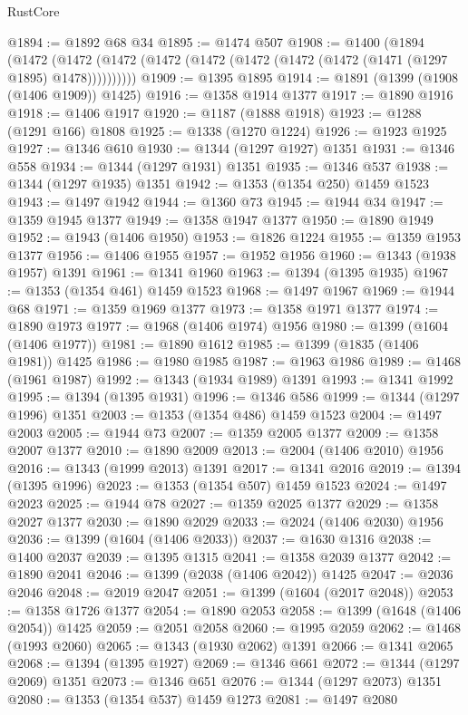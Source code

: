 \begin{lexlean}{RustCore}
\begin{coremodule}
@1894 := @1892 @68 @34
@1895 := @1474 @507
@1908 := @1400
    (@1894
      (@1472 (@1472 (@1472 (@1472 (@1472 (@1472 (@1472 (@1472 (@1471 (@1297 @1895) @1478))))))))))
@1909 := @1395 @1895
@1914 := @1891 (@1399 (@1908 (@1406 @1909)) @1425)
@1916 := @1358 @1914 @1377
@1917 := @1890 @1916
@1918 := @1406 @1917
@1920 := @1187 (@1888 @1918)
@1923 := @1288 (@1291 @166) @1808
@1925 := @1338 (@1270 @1224)
@1926 := @1923 @1925
@1927 := @1346 @610
@1930 := @1344 (@1297 @1927) @1351
@1931 := @1346 @558
@1934 := @1344 (@1297 @1931) @1351
@1935 := @1346 @537
@1938 := @1344 (@1297 @1935) @1351
@1942 := @1353 (@1354 @250) @1459 @1523
@1943 := @1497 @1942
@1944 := @1360 @73
@1945 := @1944 @34
@1947 := @1359 @1945 @1377
@1949 := @1358 @1947 @1377
@1950 := @1890 @1949
@1952 := @1943 (@1406 @1950)
@1953 := @1826 @1224
@1955 := @1359 @1953 @1377
@1956 := @1406 @1955
@1957 := @1952 @1956
@1960 := @1343 (@1938 @1957) @1391
@1961 := @1341 @1960
@1963 := @1394 (@1395 @1935)
@1967 := @1353 (@1354 @461) @1459 @1523
@1968 := @1497 @1967
@1969 := @1944 @68
@1971 := @1359 @1969 @1377
@1973 := @1358 @1971 @1377
@1974 := @1890 @1973
@1977 := @1968 (@1406 @1974) @1956
@1980 := @1399 (@1604 (@1406 @1977))
@1981 := @1890 @1612
@1985 := @1399 (@1835 (@1406 @1981)) @1425
@1986 := @1980 @1985
@1987 := @1963 @1986
@1989 := @1468 (@1961 @1987)
@1992 := @1343 (@1934 @1989) @1391
@1993 := @1341 @1992
@1995 := @1394 (@1395 @1931)
@1996 := @1346 @586
@1999 := @1344 (@1297 @1996) @1351
@2003 := @1353 (@1354 @486) @1459 @1523
@2004 := @1497 @2003
@2005 := @1944 @73
@2007 := @1359 @2005 @1377
@2009 := @1358 @2007 @1377
@2010 := @1890 @2009
@2013 := @2004 (@1406 @2010) @1956
@2016 := @1343 (@1999 @2013) @1391
@2017 := @1341 @2016
@2019 := @1394 (@1395 @1996)
@2023 := @1353 (@1354 @507) @1459 @1523
@2024 := @1497 @2023
@2025 := @1944 @78
@2027 := @1359 @2025 @1377
@2029 := @1358 @2027 @1377
@2030 := @1890 @2029
@2033 := @2024 (@1406 @2030) @1956
@2036 := @1399 (@1604 (@1406 @2033))
@2037 := @1630 @1316
@2038 := @1400 @2037
@2039 := @1395 @1315
@2041 := @1358 @2039 @1377
@2042 := @1890 @2041
@2046 := @1399 (@2038 (@1406 @2042)) @1425
@2047 := @2036 @2046
@2048 := @2019 @2047
@2051 := @1399 (@1604 (@2017 @2048))
@2053 := @1358 @1726 @1377
@2054 := @1890 @2053
@2058 := @1399 (@1648 (@1406 @2054)) @1425
@2059 := @2051 @2058
@2060 := @1995 @2059
@2062 := @1468 (@1993 @2060)
@2065 := @1343 (@1930 @2062) @1391
@2066 := @1341 @2065
@2068 := @1394 (@1395 @1927)
@2069 := @1346 @661
@2072 := @1344 (@1297 @2069) @1351
@2073 := @1346 @651
@2076 := @1344 (@1297 @2073) @1351
@2080 := @1353 (@1354 @537) @1459 @1273
@2081 := @1497 @2080

\end{coremodule}
\end{lexlean}
